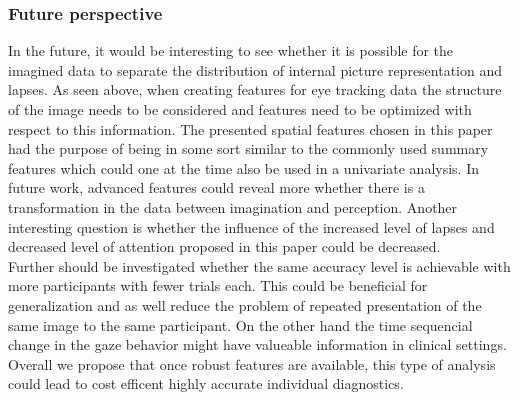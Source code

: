 \documentclass[a4paper,man,natbib,floatsintext]{apa6}
\begin{document}
\subsubsection{Future perspective}
In the future, it would be interesting to see whether it is possible for the imagined data to separate the distribution of internal picture representation and lapses.  As seen above, when creating features for eye tracking data the structure of the image needs to be considered and features need to be optimized with respect to this information. 
The presented spatial features chosen in this paper had the purpose of being in some sort similar to the commonly used summary features which could one at the time also be used in a univariate analysis. In future work, advanced features could reveal more whether there is a transformation in the data between imagination and perception. Another interesting question is whether the influence of the increased level of lapses and decreased level of attention proposed in this paper could be decreased.\\
Further should be investigated whether the same accuracy level is achievable with more participants with fewer trials each. This could be beneficial for generalization and as well reduce the problem of repeated presentation of the same image to the same participant. On the other hand the time sequencial change in the gaze behavior might have valueable information in clinical settings.  Overall we propose that once robust features are available, this type of analysis could lead to cost efficent highly accurate individual diagnostics.

\clearpage
 

 
\newpage
\clearpage
\end{document}
